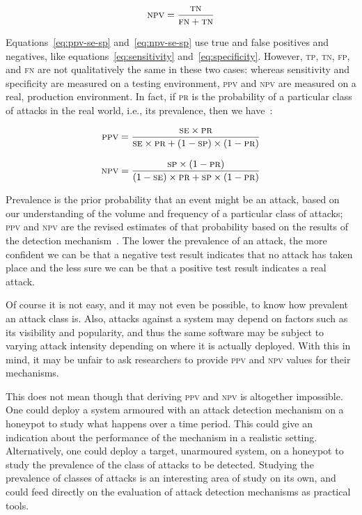 \documentclass[10pt,journal,compsoc]{IEEEtran}
\begin{document}
\begin{equation}
\textsc{npv} = \frac{\textsc{tn}}{\textsc{fn} + \textsc{tn}}
\end{equation}

\noindent
Equations~\ref{eq:ppv-se-sp} and~\ref{eq:npv-se-sp} use true and false
positives and negatives, like equations~\ref{eq:sensitivity}
and~\ref{eq:specificity}. However, \textsc{tp}, \textsc{tn},
\textsc{fp}, and \textsc{fn} are not qualitatively the same in these two cases:
whereas sensitivity and specificity are measured on a testing
environment, \textsc{ppv} and \textsc{npv} are measured on a real,
production environment. In fact, if \textsc{pr} is the probability of
a particular class of attacks in the real world,
i.e., its prevalence, then we
have~\cite{linn2004,altman1994}:

\begin{equation}
\textsc{ppv} = \frac{\textsc{se}\times \textsc{pr}}{
\textsc{se}\times \textsc{pr} + (1 - \textsc{sp})\times (1 -
\textsc{pr})}
\label{eq:ppv-se-sp}
\end{equation}

\begin{equation}
\textsc{npv} = \frac{\textsc{sp}\times (1 - \textsc{pr})}{
(1 - \textsc{se})\times \textsc{pr} + \textsc{sp}\times (1 -
\textsc{pr})}
\label{eq:npv-se-sp}
\end{equation}

\noindent
Prevalence is the prior probability that an event might be an attack,
based on our understanding of the volume and frequency of a particular
class of attacks; 
\textsc{ppv} and \textsc{npv} are the revised estimates of that
probability based on the results of the detection
mechanism~\cite{altman1994}. The lower the prevalence of an attack,
the more confident we can be that a negative test result indicates
that no attack has taken place and the less sure we can be that a
positive test result indicates a real attack. 

Of course it is not easy, and it may not even be possible, to know how
prevalent an attack class is. Also, attacks against a system may depend on
factors such as its visibility and popularity, and thus the same
software may be subject to varying attack intensity depending on
where it is actually deployed. With this in mind, it may be unfair to
ask researchers to provide \textsc{ppv} and \textsc{npv} values for
their mechanisms.

This does not mean though that deriving \textsc{ppv} and \textsc{npv} is
altogether impossible. One could deploy a system armoured with an
attack detection mechanism on a honeypot to study what happens over
a time period. This could give an indication about the performance of
the mechanism in a realistic setting. Alternatively, one could deploy a
target, unarmoured system, on a honeypot to study the prevalence of
the class of attacks to be detected. Studying the prevalence of
classes of attacks is an interesting area of study on its own,
and could feed directly on the evaluation of attack detection
mechanisms as practical tools.
\end{document}
